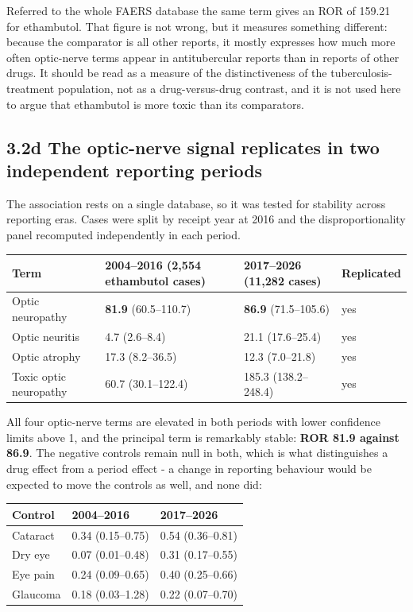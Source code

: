 \documentclass[utf8]{FrontiersinVancouver}
\begin{document}
Referred to the whole FAERS database the same term gives an ROR of 159.21 for ethambutol. That figure is not wrong, but it measures something different: because the comparator is all other reports, it mostly expresses how much more often optic-nerve terms appear in antitubercular reports than in reports of other drugs. It should be read as a measure of the distinctiveness of the tuberculosis-treatment population, not as a drug-versus-drug contrast, and it is not used here to argue that ethambutol is more toxic than its comparators.

\subsection{3.2d The optic-nerve signal replicates in two independent reporting periods}

The association rests on a single database, so it was tested for stability across reporting eras. Cases were split by receipt year at 2016 and the disproportionality panel recomputed independently in each period.

\begin{table}[htbp]
\centering
\begin{tabular}{llll}
\hline
Term & 2004--2016 (2,554 ethambutol cases) & 2017--2026 (11,282 cases) & Replicated \\
\hline
Optic neuropathy & \textbf{81.9} (60.5--110.7) & \textbf{86.9} (71.5--105.6) & yes \\
Optic neuritis & 4.7 (2.6--8.4) & 21.1 (17.6--25.4) & yes \\
Optic atrophy & 17.3 (8.2--36.5) & 12.3 (7.0--21.8) & yes \\
Toxic optic neuropathy & 60.7 (30.1--122.4) & 185.3 (138.2--248.4) & yes \\
\hline
\end{tabular}
\end{table}

All four optic-nerve terms are elevated in both periods with lower confidence limits above 1, and the principal term is remarkably stable: \textbf{ROR 81.9 against 86.9}. The negative controls remain null in both, which is what distinguishes a drug effect from a period effect - a change in reporting behaviour would be expected to move the controls as well, and none did:

\begin{table}[htbp]
\centering
\begin{tabular}{lll}
\hline
Control & 2004--2016 & 2017--2026 \\
\hline
Cataract & 0.34 (0.15--0.75) & 0.54 (0.36--0.81) \\
Dry eye & 0.07 (0.01--0.48) & 0.31 (0.17--0.55) \\
Eye pain & 0.24 (0.09--0.65) & 0.40 (0.25--0.66) \\
Glaucoma & 0.18 (0.03--1.28) & 0.22 (0.07--0.70) \\
\hline
\end{tabular}
\end{table}
\end{document}
